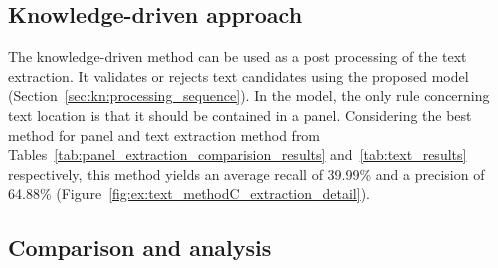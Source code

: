 




\subsection{Knowledge-driven approach} %

The knowledge-driven method can be used as a post processing of the text extraction.
It validates or rejects text candidates using the proposed model (Section~\ref{sec:kn:processing_sequence}).
In the model, the only rule concerning text location is that it should be contained in a panel.
Considering the best method for panel and text extraction method from Tables~\ref{tab:panel_extraction_comparision_results} and~\ref{tab:text_results} respectively, this method yields an average recall of 39.99\% and a precision of 64.88\% (Figure~\ref{fig:ex:text_methodC_extraction_detail}).







\subsection{Comparison and analysis} %
\label{sub:results_analysis}

